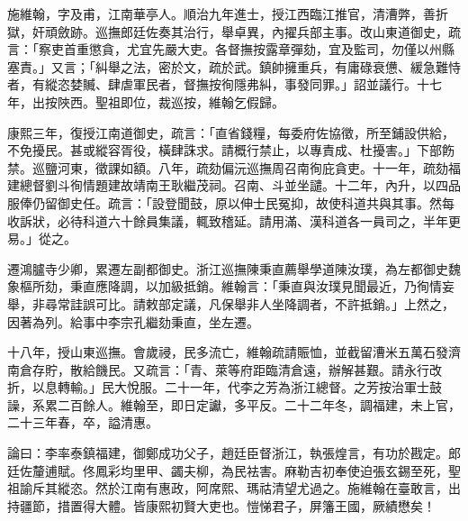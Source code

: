 \begin{pinyinscope}
施維翰，字及甫，江南華亭人。順治九年進士，授江西臨江推官，清漕弊，善折獄，奸頑斂跡。巡撫郎廷佐奏其治行，舉卓異，內擢兵部主事。改山東道御史，疏言：「察吏首重懲貪，尤宜先嚴大吏。各督撫按露章彈劾，宜及監司，勿僅以州縣塞責。」又言；「糾舉之法，密於文，疏於武。鎮帥擁重兵，有庸碌衰憊、緩急難恃者，有縱恣婪贓、肆虐軍民者，督撫按徇隱弗糾，事發同罪。」詔並議行。十七年，出按陜西。聖祖即位，裁巡按，維翰乞假歸。

康熙三年，復授江南道御史，疏言：「直省錢糧，每委府佐協徵，所至鋪設供給，不免擾民。甚或縱容胥役，橫肆誅求。請概行禁止，以專責成、杜擾害。」下部飭禁。巡鹽河東，徵課如額。八年，疏劾偏沅巡撫周召南徇庇貪吏。十一年，疏劾福建總督劉斗徇情題建故靖南王耿繼茂祠。召南、斗並坐譴。十二年，內升，以四品服俸仍留御史任。疏言：「設登聞鼓，原以伸士民冤抑，故使科道共與其事。然每收訴狀，必待科道六十餘員集議，輒致稽延。請用滿、漢科道各一員司之，半年更易。」從之。

遷鴻臚寺少卿，累遷左副都御史。浙江巡撫陳秉直薦舉學道陳汝璞，為左都御史魏象樞所劾，秉直應降調，以加級抵銷。維翰言：「秉直與汝璞見聞最近，乃徇情妄舉，非尋常詿誤可比。請敕部定議，凡保舉非人坐降調者，不許抵銷。」上然之，因著為列。給事中李宗孔繼劾秉直，坐左遷。

十八年，授山東巡撫。會歲祲，民多流亡，維翰疏請賑恤，並截留漕米五萬石發濟南倉存貯，散給饑民。又疏言：「青、萊等府距臨清倉遠，辦解甚艱。請永行改折，以息轉輸。」民大悅服。二十一年，代李之芳為浙江總督。之芳按治軍士鼓譟，系累二百餘人。維翰至，即日定讞，多平反。二十二年冬，調福建，未上官，二十三年春，卒，謚清惠。

論曰：李率泰鎮福建，御鄭成功父子，趙廷臣督浙江，執張煌言，有功於戡定。郎廷佐釐逋賦。佟鳳彩均里甲、蠲夫柳，為民袪害。麻勒吉初奉使迫張玄錫至死，聖祖諭斥其縱恣。然於江南有惠政，阿席熙、瑪祜清望尤過之。施維翰在臺敢言，出持疆節，措置得大體。皆康熙初賢大吏也。愷悌君子，屏籓王國，厥績懋矣！


\end{pinyinscope}